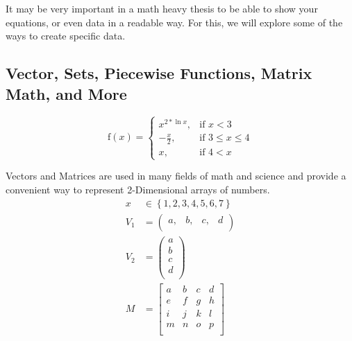 		It may be very important in a math heavy thesis to be able to show your equations, or even data in a readable way. For this, we will explore some of the ways to create specific data.
    
        \subsection{Vector, Sets, Piecewise Functions, Matrix Math, and More}
        
			\begin{equation}
				\text{f}(x) = 
					\begin{cases}
						x^{2*\ln{x}},&\text{if }x<3\\
						-\frac{x}{2},&\text{if }3\leq{}x\leq{}4\\
						x,&\text{if }4<x
					\end{cases}
			\end{equation}
        
			Vectors and Matrices are used in many fields of math and science and provide a convenient way to represent 2-Dimensional arrays of numbers.
			\begin{align}
				x&\in{}\left\{1,2,3,4,5,6,7\right\}\\
				V_{1} &= {\left(
				\begin{array}{cccc}
					a, & b, & c, & d\\
				\end{array}
				\right)}\\
				V_{2} &= \left(
				\begin{array}{c}
					a \\
					b \\
					c \\
					d \\
				\end{array}
				\right)\\
				M &= {\left[
				\begin{array}{cccc}
					a & b & c & d\\
					e & f & g & h\\
					i & j & k & l\\
					m & n & o & p\\
				\end{array}
				\right]}
			\end{align}